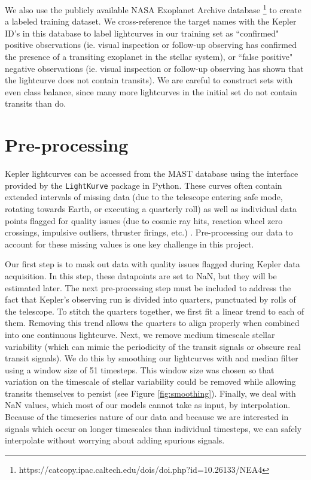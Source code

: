 \documentclass{article}
\begin{document}
We also use the publicly available NASA Exoplanet Archive database \footnote{https://catcopy.ipac.caltech.edu/dois/doi.php?id=10.26133/NEA4} to create a labeled training  dataset. We cross-reference the target names with the Kepler ID's in this database to label lightcurves in our training set as ``confirmed" positive observations (ie. visual inspection  or follow-up observing has confirmed the presence of a transiting exoplanet in the stellar system), or ``false positive" negative observations (ie. visual inspection  or follow-up observing has shown that the lightcurve does not contain transits). We are careful to construct sets with even class balance, since many more lightcurves in the initial set do not contain transits than do.

\section{Pre-processing}
Kepler lightcurves can be accessed from the MAST database using the interface provided by the \texttt{LightKurve} package in Python. These curves often contain extended intervals of missing data (due to the telescope entering safe mode, rotating towards Earth, or executing a quarterly roll) as well as individual data points flagged for quality issues (due to cosmic ray hits, reaction wheel zero crossings, impulsive outliers, thruster firings, etc.) \citep{Thompson_2016}. Pre-processing our data to account for these missing values is one key challenge in this project. 

Our first step is to mask out data with quality issues flagged during Kepler data acquisition. In this step, these datapoints are set to NaN, but they will be estimated later. The next pre-processing step must be included to address the fact that Kepler's observing run is divided into quarters, punctuated by rolls of the telescope. To stitch the quarters together, we first fit a linear trend to each of them. Removing this trend allows the quarters to align properly when combined into one continuous lightcurve. Next, we remove medium timescale stellar variability (which can mimic the periodicity of the transit signals or obscure real transit signals). We do this by smoothing our lightcurves with and median filter using a window size of 51 timesteps. This window size was chosen so that variation on the timescale of stellar variability could be removed while allowing transits themselves to persist (see Figure \ref{fig:smoothing}). Finally, we deal with NaN values, which most of our models cannot take as input, by interpolation. Because of the timeseries nature of our data and because we are interested in signals which occur on longer timescales than individual timesteps, we can safely interpolate without worrying about adding spurious signals. 
\end{document}
